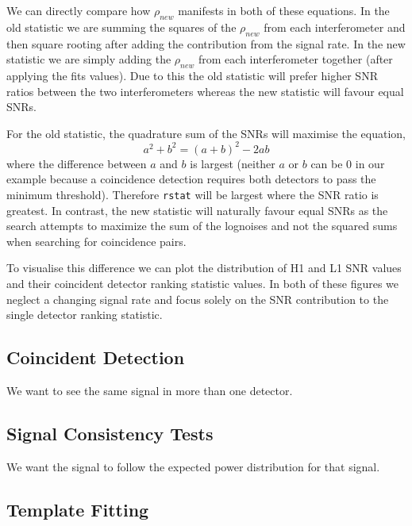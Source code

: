 We can directly compare how $\rho_{new}$ manifests in both of these equations. In the old statistic we are summing the squares of the $\rho_{new}$ from each interferometer and then square rooting after adding the contribution from the signal rate. In the new statistic we are simply adding the $\rho_{new}$ from each interferometer together (after applying the fits values). Due to this the old statistic will prefer higher SNR ratios between the two interferometers whereas the new statistic will favour equal SNRs.

For the old statistic, the quadrature sum of the SNRs will maximise the equation,
%
\begin{equation}
    a^{2} + b^{2} = (a + b)^{2} - 2ab
\end{equation}
%
where the difference between $a$ and $b$ is largest (neither $a$ or $b$ can be $0$ in our example because a coincidence detection requires both detectors to pass the minimum threshold). Therefore \verb|rstat| will be largest where the SNR ratio is greatest. In contrast, the new statistic will naturally favour equal SNRs as the search attempts to maximize the sum of the lognoises and not the squared sums when searching for coincidence pairs.

To visualise this difference we can plot the distribution of H1 and L1 SNR values and their coincident detector ranking statistic values. In both of these figures we neglect a changing signal rate and focus solely on the SNR contribution to the single detector ranking statistic.
%

\subsection{\label{2:sec:coincident-detection}Coincident Detection}

We want to see the same signal in more than one detector.

\subsection{\label{2:sec:signal-consistency-tests}Signal Consistency Tests}

We want the signal to follow the expected power distribution for that signal.

\subsection{\label{2:sec:template-fitting}Template Fitting}


